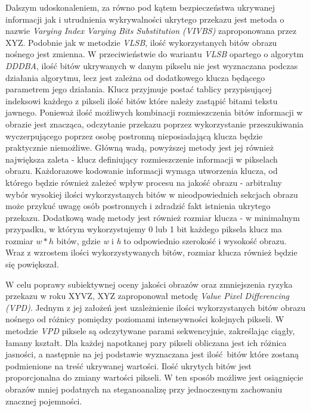 {    %
    Dalszym udoskonaleniem, za równo pod kątem bezpieczeństwa ukrywanej informacji jak i utrudnienia wykrywalności ukrytego przekazu
    jest metoda o nazwie \textit{Varying Index Varying Bits Substitution (VIVBS)} zaproponowana przez XYZ. %
    Podobnie jak w metodzie \textit{VLSB}, ilość wykorzystanych bitów obrazu nośnego jest zmienna. W przeciwieństwie do wariantu \textit{VLSB}
    opartego o algorytm \textit{DDDBA}, ilość bitów ukrywanych w danym pikselu nie jest wyznaczana podczas działania algorytmu, lecz jest
    zależna od dodatkowego klucza będącego parametrem jego działania. Klucz przyjmuje postać tablicy przypisującej indeksowi każdego z
    pikseli ilość bitów które należy zastąpić bitami tekstu jawnego. Ponieważ ilość możliwych kombinacji rozmieszczenia bitów informacji
    w obrazie jest znacząca, odczytanie przekazu poprzez wykorzystanie przeszukiwania wyczerpującego poprzez osobę postronną nieposiadającą
    klucza będzie praktycznie niemożliwe. Główną wadą, powyższej metody jest jej również największa zaleta - klucz definiujący
    rozmieszczenie informacji w pikselach obrazu. Każdorazowe kodowanie informacji wymaga utworzenia klucza, od którego będzie również
    zależeć wpływ procesu na jakość obrazu - arbitralny wybór wysokiej ilości wykorzystanych bitów w nieodpowiednich sekcjach obrazu
    może przykuć uwagę osób postronnych i zdradzić fakt istnienia ukrytego przekazu. Dodatkową wadę metody jest również rozmiar klucza - 
    w minimalnym przypadku, w którym wykorzystujemy 0 lub 1 bit każdego piksela klucz ma rozmiar $w * h$ bitów, gdzie
    \textit{w} i \textit{h} to odpowiednio szerokość i wysokość obrazu. Wraz z wzrostem ilości wykorzystywanych bitów, rozmiar klucza
    również będzie się powiększał.

    W celu poprawy subiektywnej oceny jakości obrazów oraz zmniejszenia ryzyka przekazu w roku XYVZ, XYZ zaproponował metodę %
    \textit{Value Pixel Differencing (VPD)}. Jednym z jej założeń jest uzależnienie ilości wykorzystanych bitów obrazu nośnego
    od różnicy pomiędzy poziomami intensywności kolejnych pikseli. W metodzie \textit{VPD} piksele są odczytywane parami sekwencyjnie,
    zakreślając ciągły, łamany kształt. Dla każdej napotkanej pary pikseli obliczana jest ich różnica jasności, a następnie na jej
    podstawie wyznaczana jest ilość bitów które zostaną podmienione na treść ukrywanej wartości. Ilość ukrytych bitów jest proporcjonalna
    do zmiany wartości pikseli. W ten sposób możliwe jest osiągnięcie obrazów mniej podatnych na steganoanalizę przy jednoczesnym
    zachowaniu znacznej pojemności.

}

